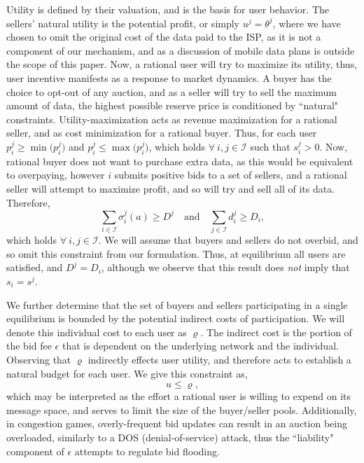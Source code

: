 \documentclass[sigconf, anonymous]{acmart}
\newcommand{\mcI}{\mathcal{I}}
\newcommand{\g}{\sigma}
\theoremstyle{definition}
\begin{document}
Utility is defined by their valuation, and is the basis for user behavior. 
The sellers' natural utility is the potential
profit, or simply $u^j = \theta^j$, where we have chosen to omit the original cost of the data
paid to the ISP, as it is not a component of our mechanism, and as a discussion
of mobile data plans is outside the scope of this paper.  
Now, a rational user will try
to maximize its utility, thus, user incentive manifests as a
response to market dynamics. A buyer has the choice to
opt-out of any auction, and as a seller will try to sell the maximum amount of
data, the highest possible reserve price is conditioned by ``natural" constraints. Utility-maximization 
acts as revenue maximization for a rational seller, and as cost minimization for a
rational buyer. Thus, for each user $p_i^j \ge \min\big(p_i^j)$ and $p_i^j \le
\max\big(p_i^j)$, which holds $\forall \ i, j\in\mcI$ such that $s_i^j>0$.
Now, rational buyer does not want to purchase extra data, as this would be
equivalent to overpaying, however $i$ submits positive bids to a set of
sellers, and a rational seller will attempt to maximize profit, and so will try and sell all of
its data. Therefore,
\begin{equation}\label{bidcap}
    \displaystyle\sum_{i\in\mcI} \g_i^j(a) \ge D^j \quad\text{and}\quad
\sum_{j\in\mcI} d^j_i \ge D_i,
\end{equation}
which holds $\forall \ i,j\in\mcI$. We will assume that buyers and sellers do not overbid, and so omit this
constraint from our formulation.
Thus, at equilibrium all users are satisfied, and 
$D^j = D_i$, although we observe that this result
does \emph{not} imply that $s_i=s^j$. 

We further determine that the set of buyers and sellers participating
in a single equilibrium is bounded by the potential indirect costs of
participation. We will denote this individual cost to each user as
$\varrho$. The indirect cost is the portion of the bid fee
$\epsilon$ that is dependent on the underlying network and the individual.
Observing that $\varrho$ indirectly effects user utility,
and therefore acts to establish a natural budget for each user. We give this
constraint as, 
\begin{equation}\label{poolbnd}
    u \le \varrho,
\end{equation}
which may be interpreted as the effort a rational user is willing to expend
on its message space, and serves to limit the size of the buyer/seller pools. 
Additionally, in congestion games,
overly-frequent bid updates can result in an auction being
overloaded, similarly to a DOS (denial-of-service) attack, thus the
``liability" component of $\epsilon$ attempts to regulate bid flooding. 
\end{document}
